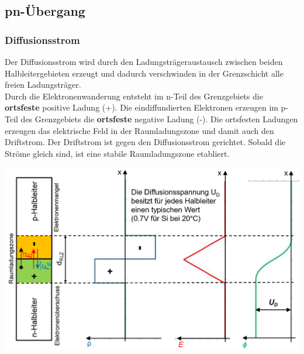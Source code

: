\begin{multicols}{2}
    \begin{minipage}{\linewidth}
        \vspace{-2cm}
        \subsection{pn-Übergang}
        \subsubsection{Diffusionsstrom}
            Der Diffusionsstrom wird durch den Ladungsträgeraustausch zwischen beiden Halbleitergebieten erzeugt und dadurch verschwinden in der Grenzschicht alle freien Ladungsträger.\\
            Durch die Elektronenwanderung entsteht im n-Teil des Grenzgebiets die \textbf{ortsfeste} positive Ladung (+). Die eindiffundierten Elektronen erzeugen im p-Teil des Grenzgebiets die \textbf{ortsfeste} negative Ladung (-). Die ortsfesten Ladungen erzeugen das elektrische Feld in der Raumladungszone und damit auch den Driftstrom.\newline
            Der Driftstrom ist gegen den Diffusionsstrom gerichtet. Sobald die Ströme gleich sind, ist eine stabile \newline Raumladungszone etabliert.   
    \end{minipage}
    
    \includegraphics[width=0.9\linewidth]{images/pnuebergang}
\end{multicols}

